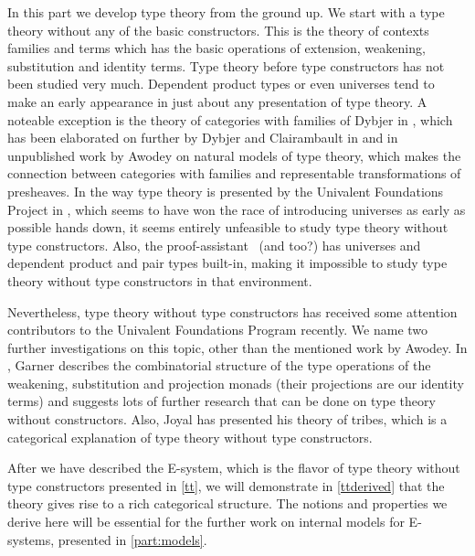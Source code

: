 \documentclass{article}
\begin{document}
In this part we develop type theory from the ground up. We start with a type
theory without any of the basic constructors. This is the theory of contexts
families and terms which has the basic operations of extension, weakening,
substitution and identity terms. Type theory before type constructors has not
been studied very much. Dependent product types or even universes tend to make
an early appearance in just about any presentation of type theory.
A noteable exception is the theory of categories with families of Dybjer
in \cite{Dybjer1996}, which has been elaborated on further by Dybjer and
Clairambault in \cite{DybjerClairambault2011} and in unpublished work by
Awodey \cite{Awodey2013} on natural models of type theory,
which makes the connection between categories with families and representable
transformations of presheaves. In the way type theory is presented by the
Univalent Foundations Project in \cite{TheBook}, which seems to have won the race of introducing universes
as early as possible hands down, it seems entirely unfeasible to study type
theory without type constructors. Also, the 
proof-assistant \Coq\ {\color{red}(and \Agda too?)} has universes and dependent product and pair types 
built-in, making it impossible to study type theory without type constructors in 
that environment.

Nevertheless, type theory without type constructors has received some attention
contributors to the Univalent Foundations Program recently. We name two
further investigations on this topic, other than the mentioned work by Awodey.
In \cite{Garner2014}, Garner describes the combinatorial structure
of the type operations of the weakening, substitution and projection monads
(their projections are our identity terms) and suggests lots of further research
that can be done on type theory without constructors. Also, Joyal has presented
his theory of tribes, which is a categorical explanation of type theory
without type constructors.

After we have described the E-system, which is the flavor of type theory without
type constructors presented in \autoref{tt}, we will demonstrate in \autoref{ttderived}
that the theory gives rise to a rich categorical structure. The notions and
properties we derive here will be essential for the further work on internal
models for E-systems, presented in \autoref{part:models}.






%
\end{document}
